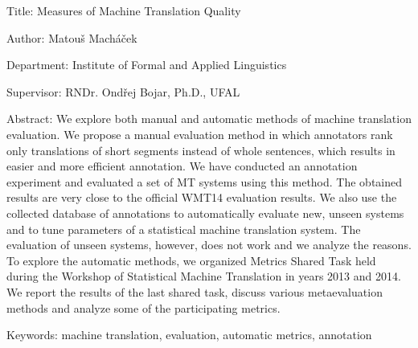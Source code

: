 Title:
Measures of Machine Translation Quality

Author:
Matouš Macháček

Department:
Institute of Formal and Applied Linguistics

Supervisor:
RNDr. Ondřej Bojar, Ph.D., UFAL

Abstract: We explore both manual and automatic methods of machine translation
evaluation. We propose a manual evaluation method in which annotators rank only
translations of short segments instead of whole sentences, which results in
easier and more efficient annotation. We have conducted an annotation
experiment and evaluated a set of MT systems using this method. The obtained
results are very close to the official WMT14 evaluation results. We also use
the collected database of annotations to automatically evaluate new, unseen
systems and to tune parameters of a statistical machine translation system.
The evaluation of unseen systems, however, does not work and we analyze the
reasons. To explore the automatic methods, we organized Metrics Shared Task
held during the Workshop of Statistical Machine Translation in years 2013 and
2014. We report the results of the last shared task, discuss various
metaevaluation methods and analyze some of the participating metrics.


Keywords:
machine translation, evaluation, automatic metrics, annotation
